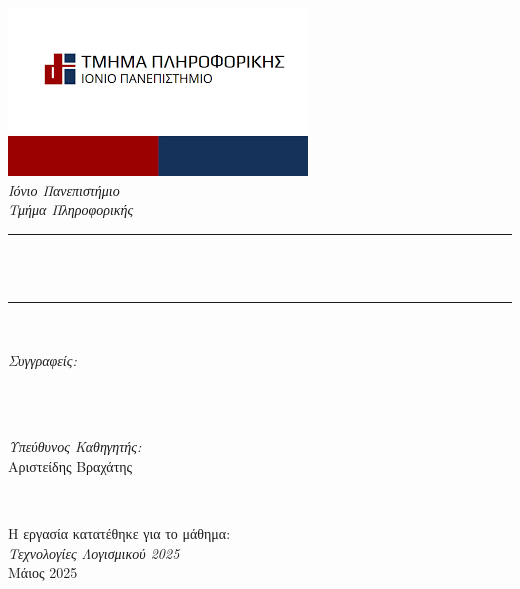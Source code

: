 
\begin{titlepage}
    \newcommand{\HRule}{\rule{\linewidth}{0.5mm}}
    \center 
    \includegraphics[width=0.6\linewidth]{title/ionian_university_logo.png}\\[0.5cm]
    \textsl{\Huge Ιόνιο Πανεπιστήμιο}\\[0.5cm] 
    \textsl{\Large Τμήμα Πληροφορικής}\\[2cm] 
    \makeatletter
    \HRule \\[0.6cm]
    {\huge \bfseries \@title}\\[0.3cm]
    \HRule \\[2cm]
    \large
    
    \begin{minipage}{0.45\textwidth}
    	\begin{flushleft}
            \emph{Συγγραφείς:}\\
            \@author \\
        \end{flushleft}
    \end{minipage}
    ~
    \begin{minipage}{0.45\textwidth}
    	\begin{flushright}
            \emph{Υπεύθυνος Καθηγητής:} \\
            \textup{Αριστείδης Βραχάτης}
        \end{flushright}
    \end{minipage}\\[3cm]
    
    \makeatother
    
    {\large Η εργασία κατατέθηκε για το μάθημα:}\\[0.2cm]
    {\Large \emph{Τεχνολογίες Λογισμικού 2025}}\\[1cm]
    {\large Μάιος 2025}\\[2cm]
    \vfill 
\end{titlepage}

\restoregeometry
